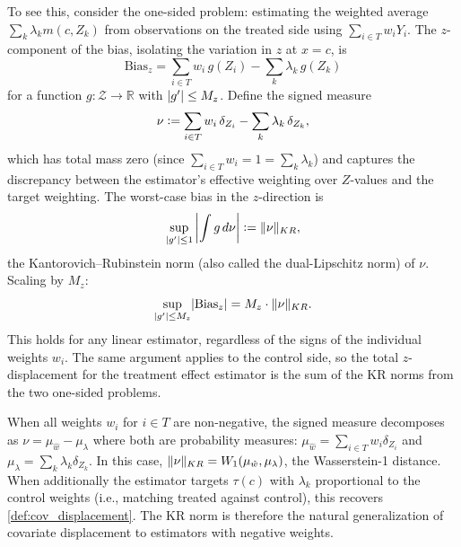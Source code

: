 To see this, consider the one-sided problem: estimating the weighted average $\sum_k \lambda_k m(c, Z_k)$ from observations on the treated side using $\sum_{i \in T} w_i Y_i$.
The $z$-component of the bias, isolating the variation in $z$ at $x = c$, is
\begin{equation}\label{eq:bias_z_functional}
	\text{Bias}_z = \sum_{i \in T} w_i\, g(Z_i) - \sum_{k} \lambda_k\, g(Z_k)
\end{equation}
for a function $g : \mathcal{Z} \to \mathbb{R}$ with $\lvert g'\rvert \leq M_z$.
Define the signed measure
\begin{equation}\label{eq:signed_measure}
	\nu \vcentcolon= \sum_{i \in T} w_i\, \delta_{Z_i} - \sum_{k} \lambda_k\, \delta_{Z_k},
\end{equation}
which has total mass zero (since $\sum_{i \in T} w_i = 1 = \sum_k \lambda_k$) and captures the discrepancy between the estimator's effective weighting over $Z$-values and the target weighting.
The worst-case bias in the $z$-direction is
\begin{equation}\label{eq:kr_bias}
	\sup_{\lvert g'\rvert \leq 1} \left|\int g\, d\nu \right| \vcentcolon= \lVert\nu\rVert_{KR},
\end{equation}
the Kantorovich--Rubinstein norm (also called the dual-Lipschitz norm) of $\nu$.
Scaling by $M_z$:
\begin{equation}\label{eq:bias_kr}
	\sup_{\lvert g'\rvert \leq M_z} \lvert\text{Bias}_z\rvert = M_z \cdot \lVert\nu\rVert_{KR}.
\end{equation}
This holds for any linear estimator, regardless of the signs of the individual weights $w_i$.
The same argument applies to the control side, so the total $z$-displacement for the treatment effect estimator is the sum of the KR norms from the two one-sided problems.

\begin{remark}\label{rem:kr_wasserstein}
	When all weights $w_i$ for $i \in T$ are non-negative, the signed measure decomposes as $\nu = \mu_{\hat{w}} - \mu_\lambda$ where both are probability measures: $\mu_{\hat{w}} = \sum_{i \in T} w_i \delta_{Z_i}$ and $\mu_\lambda = \sum_k \lambda_k \delta_{Z_k}$.
	In this case, $\lVert\nu\rVert_{KR} = W_1(\mu_{\hat{w}}, \mu_\lambda)$, the Wasserstein-1 distance.
	When additionally the estimator targets $\tau(c)$ with $\lambda_k$ proportional to the control weights (i.e., matching treated against control), this recovers \cref{def:cov_displacement}.
	The KR norm is therefore the natural generalization of covariate displacement to estimators with negative weights.
\end{remark}

